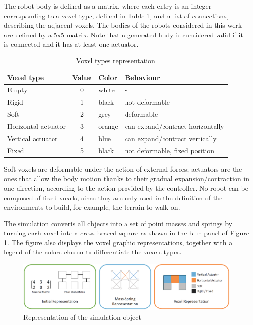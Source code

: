 The robot body is defined as a matrix, where each entry is an integer corresponding to a voxel type, defined in Table \ref{tab:voxel}, and a list of connections, describing the adjacent voxels. The bodies of the robots considered in this work are defined by a 5x5 matrix.
Note that a generated body is considered valid if it is connected and it has at least one actuator.

\begin{table}[h]
    \centering
    \begin{tabular}{|l|c|l|l|}
        \hline
        \textbf{Voxel type} & \textbf{Value} & \textbf{Color} & \textbf{Behaviour}\\
        \hline
        Empty & 0 & white & -\\
        Rigid & 1 & black & not deformable\\
        Soft & 2 & grey & deformable\\
        Horizontal actuator & 3 & orange & can expand/contract horizontally\\
        Vertical actuator & 4 & blue & can expand/contract vertically\\
        Fixed & 5 & black & not deformable, fixed position\\
        \hline
    \end{tabular}
    \caption{Voxel types representation}
    \label{tab:voxel}
\end{table}

Soft voxels are deformable under the action of external forces; actuators are the ones that allow the body motion thanks to their gradual expansion/contraction in one direction, according to the action provided by the controller.
No robot can be composed of fixed voxels, since they are only used in the definition of the environments to build, for example, the terrain to walk on.

The simulation converts all objects into a set of point masses and springs by turning each voxel
into a cross-braced square as shown in the blue panel of Figure \ref{fig:obj_repr}. The figure also displays the voxel graphic representations, together with a legend of the colors chosen to differentiate the voxels types.

\begin{figure}
    \centering
    \includegraphics[scale=0.4]{images/obj_representation}
    \caption{Representation of the simulation object\cite{bhatia2021evolution}}
    \label{fig:obj_repr}
\end{figure}



